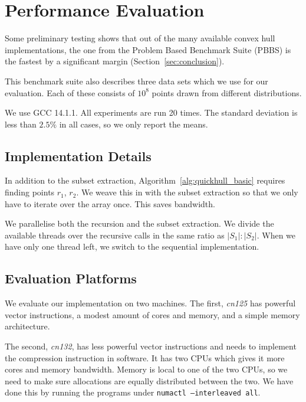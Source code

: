 \section{Performance Evaluation}\label{sec:evaluation}

Some preliminary testing shows that out of the many available convex hull
implementations, the one from the Problem Based Benchmark Suite (PBBS) 
\cite{pbbs} is the fastest by a significant margin
(Section~\ref{sec:conclusion}).

This benchmark suite also describes three data sets which we use for
our evaluation. Each of these consists of $10^8$ points drawn from different
distributions. 

We use GCC 14.1.1. All experiments are run 20 times. The standard deviation is 
less than $2.5\%$ in all cases, so we only report the means.

\subsection{Implementation Details}

In addition to the subset extraction, Algorithm~\ref{alg:quickhull_basic}
requires finding points $r_1$, $r_2$. We weave this in with the subset
extraction so that we only have to iterate over the array once. This saves
bandwidth.

We parallelise both the recursion and the subset extraction. We divide the
available threads over the recursive calls in the same ratio as
$|S_1| : |S_2|$. When we have only one thread left, we switch to the sequential
implementation.

\subsection{Evaluation Platforms}


We evaluate our implementation on two machines. The first, \textit{cn125}
has powerful vector instructions, a modest amount of cores and memory, and a 
simple memory architecture. 

The second, \textit{cn132}, has less powerful vector instructions and needs
to implement the compression instruction in software. It has two CPUs which
gives it more cores and memory bandwidth. Memory is local to one of the two
CPUs, so we need to make sure allocations are equally distributed between the
two. We have done this by running the programs under
\texttt{numactl --interleaved all}.

